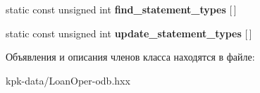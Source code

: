 \begin{DoxyCompactItemize}
\item 
static const unsigned int {\bfseries find\+\_\+statement\+\_\+types} \mbox{[}$\,$\mbox{]}\hypertarget{classodb_1_1access_1_1object__traits__impl_3_01_1_1kpk_1_1data_1_1_loan_oper_00_01id__pgsql_01_4_abd09fb2f8c54e81e9ad691b231dfc779}{}\label{classodb_1_1access_1_1object__traits__impl_3_01_1_1kpk_1_1data_1_1_loan_oper_00_01id__pgsql_01_4_abd09fb2f8c54e81e9ad691b231dfc779}

\item 
static const unsigned int {\bfseries update\+\_\+statement\+\_\+types} \mbox{[}$\,$\mbox{]}\hypertarget{classodb_1_1access_1_1object__traits__impl_3_01_1_1kpk_1_1data_1_1_loan_oper_00_01id__pgsql_01_4_aca94c34a5303eba488c1592e28d5e605}{}\label{classodb_1_1access_1_1object__traits__impl_3_01_1_1kpk_1_1data_1_1_loan_oper_00_01id__pgsql_01_4_aca94c34a5303eba488c1592e28d5e605}

\end{DoxyCompactItemize}


Объявления и описания членов класса находятся в файле\+:\begin{DoxyCompactItemize}
\item 
kpk-\/data/Loan\+Oper-\/odb.\+hxx\end{DoxyCompactItemize}
